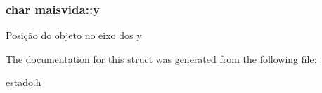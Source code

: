 \subsubsection[{\texorpdfstring{y}{y}}]{\setlength{\rightskip}{0pt plus 5cm}char maisvida\+::y}\hypertarget{structmaisvida_a59d8e5562b01360f5982c23dbbfa8c00}{}\label{structmaisvida_a59d8e5562b01360f5982c23dbbfa8c00}
Posição do objeto no eixo dos y 

The documentation for this struct was generated from the following file\+:\begin{DoxyCompactItemize}
\item 
\hyperlink{estado_8h}{estado.\+h}\end{DoxyCompactItemize}
